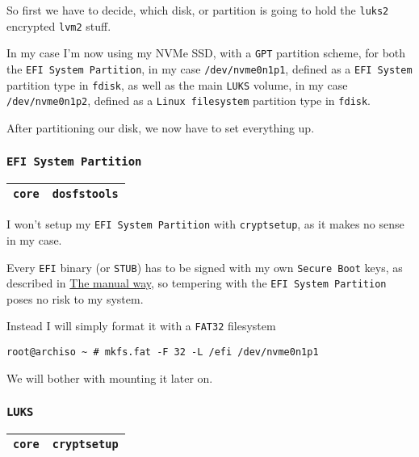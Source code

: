 \documentclass[9pt]{report}
\begin{document}
\vfill\eject

So first we have to decide, which disk, or partition is going to hold the \texttt{luks2} encrypted \texttt{lvm2} stuff.


In my case I’m now using my NVMe SSD, with a \texttt{GPT} partition scheme, for both the \texttt{EFI System Partition}, in my case \texttt{/dev/nvme0n1p1}, defined as a \texttt{EFI System} partition type in \texttt{fdisk}, as well as the main \texttt{LUKS} volume, in my case \texttt{/dev/nvme0n1p2}, defined as a \texttt{Linux filesystem} partition type in \texttt{fdisk}.


After partitioning our disk, we now have to set everything up.



\vfill\eject

\hypertarget{x-efi-system-partition}{\subsubsection{\texttt{EFI System Partition}}}
\begin{center}
\begin{tabular}{|c|c|}
\hline
\texttt{core} & \texttt{dosfstools} \\ 
\hline
\end{tabular}
\end{center}

I won’t setup my \texttt{EFI System Partition} with \texttt{cryptsetup}, as it makes no sense in my case.


Every \texttt{EFI} binary (or \texttt{STUB}) has to be signed with my own \texttt{Secure Boot} keys, as described in \hyperlink{manual-secure-boot-setup}{The manual way}, so tempering with the \texttt{EFI System Partition} poses no risk to my system.


Instead I will simply format it with a \texttt{FAT32} filesystem


\begin{verbatim}
root@archiso ~ # mkfs.fat -F 32 -L /efi /dev/nvme0n1p1
\end{verbatim}

We will bother with mounting it later on.



\vfill\eject

\hypertarget{x-luks}{\subsubsection{\texttt{LUKS}}}
\begin{center}
\begin{tabular}{|c|c|}
\hline
\texttt{core} & \texttt{cryptsetup} \\ 
\hline
\end{tabular}
\end{center}
\end{document}
